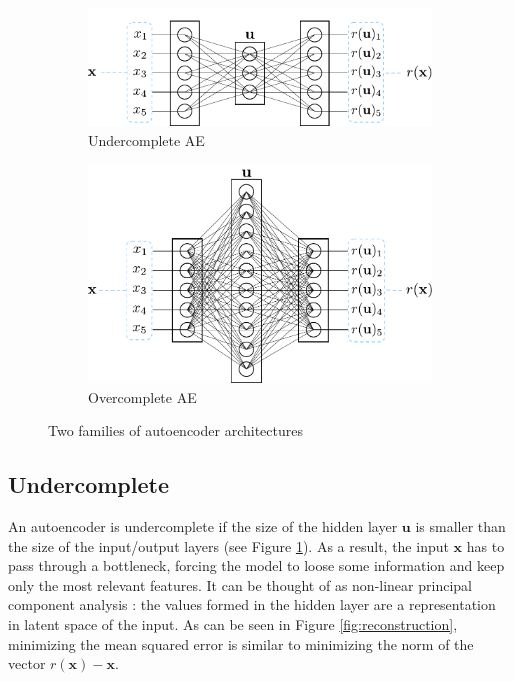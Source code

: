 \begin{figure}[!h]
\centering
\begin{subfigure}{.5\textwidth}
\vspace*{4mm}
  \centering
  \includegraphics[width=.95\linewidth]{figures/autoencoder-undercomplete}
  \caption{Undercomplete AE}
  \label{fig:undercomplete-ae}
\end{subfigure}%
\begin{subfigure}{.5\textwidth}
  \centering
  \includegraphics[width=.95\linewidth]{figures/autoencoder-overcomplete}
  \caption{Overcomplete AE}
  \label{fig:overcomplete-ae}
\end{subfigure}
\caption{Two families of autoencoder architectures}
\label{fig:under-over-ae}
\end{figure}

\subsection*{Undercomplete}
An autoencoder is undercomplete if the size of the hidden layer $\mathbf{u}$ is smaller than the size of the input/output layers (see Figure \ref{fig:undercomplete-ae}). As a result, the input $\mathbf{x}$ has to pass through a bottleneck, forcing the model to loose some information and keep only the most relevant features. It can be thought of as non-linear principal component analysis \citep{pca-ae-1, pca-ae-2}: the values formed in the hidden layer are a representation in latent space of the input. As can be seen in Figure \ref{fig:reconstruction}, minimizing the mean squared error is similar to minimizing the norm of the vector $r(\mathbf{x}) - \mathbf{x}$.

